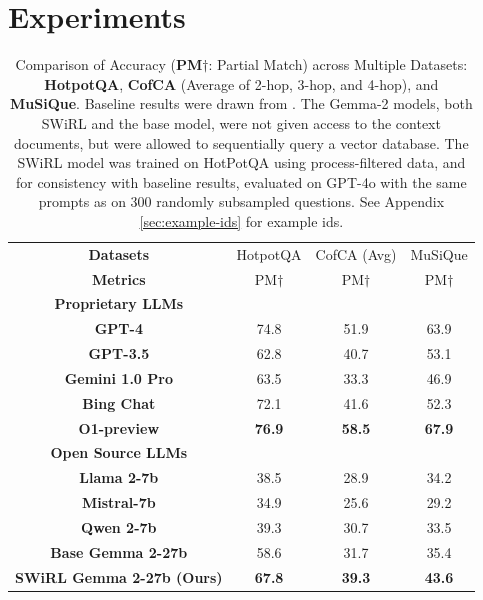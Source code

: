 \documentclass{article} %
\begin{document}
\section{Experiments}
\begin{table}[ht]
\centering
\renewcommand{\arraystretch}{.8}
\setlength{\tabcolsep}{5pt}
\begin{tabular}{c|c|c|c}
\toprule
\textbf{Datasets} & HotpotQA & CofCA (Avg) & MuSiQue \\
\textbf{Metrics}  & PM$\dagger$  & PM$\dagger$  & PM$\dagger$  \\
\midrule
\multicolumn{1}{c}{\textbf{Proprietary LLMs}} \\
\midrule
\textbf{GPT-4}       & 74.8  & 51.9  & 63.9  \\
\textbf{GPT-3.5}     & 62.8  & 40.7  & 53.1  \\
\textbf{Gemini 1.0 Pro}  & 63.5  & 33.3  & 46.9  \\
\textbf{Bing Chat}   & 72.1  & 41.6  & 52.3  \\
\textbf{O1-preview}  & \textbf{76.9}  & \textbf{58.5}  & \textbf{67.9}  \\
\midrule
\multicolumn{1}{c}{\textbf{Open Source LLMs}} \\
\midrule
\textbf{Llama 2-7b}  & 38.5  & 28.9  & 34.2  \\
\textbf{Mistral-7b}  & 34.9  & 25.6  & 29.2  \\
\textbf{Qwen 2-7b}   & 39.3  & 30.7  & 33.5  \\
\textbf{Base Gemma 2-27b}  & 58.6 & 31.7 &  35.4 \\
\textbf{SWiRL Gemma 2-27b (Ours)}  & \textbf{67.8} & \textbf{39.3} & \textbf{43.6}  \\
\bottomrule
\end{tabular}
\caption{Comparison of Accuracy (\textbf{PM}$\dagger$: Partial Match) across Multiple Datasets: \textbf{HotpotQA}, \textbf{CofCA} (Average of 2-hop, 3-hop, and 4-hop), and \textbf{MuSiQue}. Baseline results were drawn from \cite{wu2024cofcastepwisecounterfactualmultihop}. The Gemma-2 models, both SWiRL and the base model, were not given access to the context documents, but were allowed to sequentially query a vector database. The SWiRL model was trained on HotPotQA using process-filtered data, and for consistency with baseline results, evaluated on GPT-4o with the same prompts as \cite{wu2024cofcastepwisecounterfactualmultihop} on 300 randomly subsampled questions. See Appendix \ref{sec:example-ids} for example ids.}
\label{tab:llm_performance_pm}
\end{table}
\end{document}
